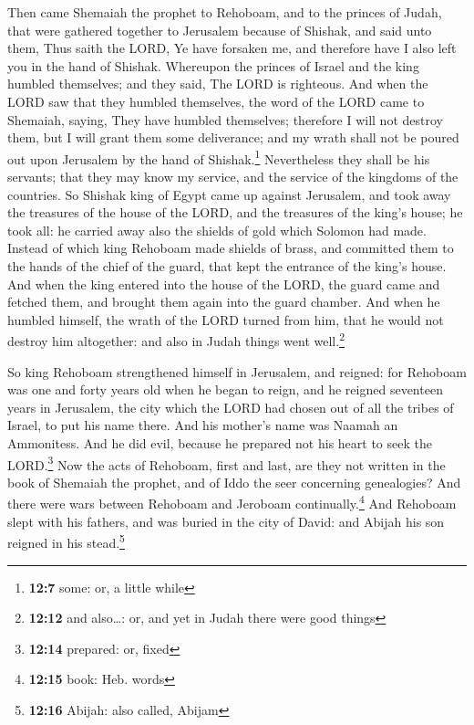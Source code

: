  Then came Shemaiah the prophet to Rehoboam, and to the
princes of Judah, that were gathered together to Jerusalem because of
Shishak, and said unto them, Thus saith the LORD, Ye have forsaken me,
and therefore have I also left you in the hand of Shishak.
 Whereupon the princes of Israel and the king humbled
themselves; and they said, The LORD is righteous.  And
when the LORD saw that they humbled themselves, the word of the LORD
came to Shemaiah, saying, They have humbled themselves; therefore I will
not destroy them, but I will grant them some deliverance; and my wrath
shall not be poured out upon Jerusalem by the hand of
Shishak.\footnote{\textbf{12:7} some: or, a little while} 
Nevertheless they shall be his servants; that they may know my service,
and the service of the kingdoms of the countries.  So
Shishak king of Egypt came up against Jerusalem, and took away the
treasures of the house of the LORD, and the treasures of the king's
house; he took all: he carried away also the shields of gold which
Solomon had made.  Instead of which king Rehoboam made
shields of brass, and committed them to the hands of the chief of the
guard, that kept the entrance of the king's house.  And
when the king entered into the house of the LORD, the guard came and
fetched them, and brought them again into the guard chamber.
 And when he humbled himself, the wrath of the LORD
turned from him, that he would not destroy him altogether: and also in
Judah things went well.\footnote{\textbf{12:12} and also\ldots: or, and
  yet in Judah there were good things}

 So king Rehoboam strengthened himself in Jerusalem, and
reigned: for Rehoboam was one and forty years old when he began to
reign, and he reigned seventeen years in Jerusalem, the city which the
LORD had chosen out of all the tribes of Israel, to put his name there.
And his mother's name was Naamah an Ammonitess.  And he
did evil, because he prepared not his heart to seek the LORD.\footnote{\textbf{12:14}
  prepared: or, fixed}  Now the acts of Rehoboam, first
and last, are they not written in the book of Shemaiah the prophet, and
of Iddo the seer concerning genealogies? And there were wars between
Rehoboam and Jeroboam continually.\footnote{\textbf{12:15} book: Heb.
  words}  And Rehoboam slept with his fathers, and was
buried in the city of David: and Abijah his son reigned in his
stead.\footnote{\textbf{12:16} Abijah: also called, Abijam}


